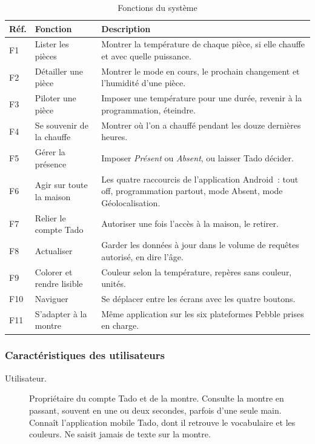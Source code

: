 \begin{table}[H]
  \centering\small
  \begin{tabularx}{\linewidth}{@{}lp{38mm}X@{}}
    \toprule
    \textbf{Réf.} & \textbf{Fonction} & \textbf{Description} \\
    \midrule
    F1  & Lister les pièces        & Montrer la température de chaque pièce, si elle chauffe et avec quelle puissance. \\
    F2  & Détailler une pièce      & Montrer le mode en cours, le prochain changement et l'humidité d'une pièce. \\
    F3  & Piloter une pièce        & Imposer une température pour une durée, revenir à la programmation, éteindre. \\
    F4  & Se souvenir de la chauffe & Montrer où l'on a chauffé pendant les douze dernières heures. \\
    F5  & Gérer la présence        & Imposer \emph{Présent} ou \emph{Absent}, ou laisser Tado décider. \\
    F6  & Agir sur toute la maison & Les quatre raccourcis de l'application Android~: tout off, programmation partout, mode Absent, mode Géolocalisation. \\
    F7  & Relier le compte Tado    & Autoriser une fois l'accès à la maison, le retirer. \\
    F8  & Actualiser               & Garder les données à jour dans le volume de requêtes autorisé, en dire l'âge. \\
    F9  & Colorer et rendre lisible & Couleur selon la température, repères sans couleur, unités. \\
    F10 & Naviguer                 & Se déplacer entre les écrans avec les quatre boutons. \\
    F11 & S'adapter à la montre    & Même application sur les six plateformes Pebble prises en charge. \\
    \bottomrule
  \end{tabularx}
  \caption{Fonctions du système}
  \label{tab:fonctions}
\end{table}

\subsubsection{Caractéristiques des utilisateurs}

\begin{description}
  \item[Utilisateur.] Propriétaire du compte Tado et de la montre. Consulte la montre en
    passant, souvent en une ou deux secondes, parfois d'une seule main. Connaît l'application
    mobile Tado, dont il retrouve le vocabulaire et les couleurs. Ne saisit jamais de texte
    sur la montre.
\end{description}

